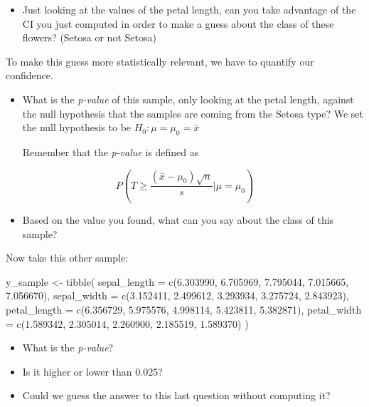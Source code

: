 \documentclass[
  oneside]{book}
\newenvironment{Shaded}{\begin{snugshade}}{\end{snugshade}}
\newcommand{\AttributeTok}[1]{\textcolor[rgb]{0.77,0.63,0.00}{#1}}
\newcommand{\FloatTok}[1]{\textcolor[rgb]{0.00,0.00,0.81}{#1}}
\newcommand{\FunctionTok}[1]{\textcolor[rgb]{0.00,0.00,0.00}{#1}}
\newcommand{\NormalTok}[1]{#1}
\newcommand{\OtherTok}[1]{\textcolor[rgb]{0.56,0.35,0.01}{#1}}
\providecommand{\tightlist}{%
  \setlength{\itemsep}{0pt}\setlength{\parskip}{0pt}}
\begin{document}
\begin{itemize}
\tightlist
\item
  Just looking at the values of the petal length,
  can you take advantage of the CI you just computed
  in order to make a guess about the class of these flowers?
  (Setosa or not Setosa)
\end{itemize}

To make this guess more statistically relevant, we have
to quantify our confidence.

\begin{itemize}
\item
  What is the \emph{p-value} of this sample, only looking at the
  petal length, against the null hypothesis that the
  samples are coming from the Setosa type? We set the null
  hypothesis to be \(H_0: \mu = \mu_0 = \bar{x}\)

  Remember that the \emph{p-value} is defined as
\end{itemize}

\[ P\left(T \geq \frac{(\bar{x} - \mu_0)\sqrt{n}}{s} | \mu = \mu_0\right)\]

\begin{itemize}
\tightlist
\item
  Based on the value you found, what can you say
  about the class of this sample?
\end{itemize}

Now take this other sample:

\begin{Shaded}
\begin{Highlighting}[]
\NormalTok{y\_sample }\OtherTok{\textless{}{-}} \FunctionTok{tibble}\NormalTok{(}
  \AttributeTok{sepal\_length =} \FunctionTok{c}\NormalTok{(}\FloatTok{6.303990}\NormalTok{, }\FloatTok{6.705969}\NormalTok{, }\FloatTok{7.795044}\NormalTok{, }\FloatTok{7.015665}\NormalTok{, }\FloatTok{7.056670}\NormalTok{),}
  \AttributeTok{sepal\_width =} \FunctionTok{c}\NormalTok{(}\FloatTok{3.152411}\NormalTok{, }\FloatTok{2.499612}\NormalTok{, }\FloatTok{3.293934}\NormalTok{, }\FloatTok{3.275724}\NormalTok{, }\FloatTok{2.843923}\NormalTok{),}
  \AttributeTok{petal\_length =} \FunctionTok{c}\NormalTok{(}\FloatTok{6.356729}\NormalTok{, }\FloatTok{5.975576}\NormalTok{, }\FloatTok{4.998114}\NormalTok{, }\FloatTok{5.423811}\NormalTok{, }\FloatTok{5.382871}\NormalTok{),}
  \AttributeTok{petal\_width =} \FunctionTok{c}\NormalTok{(}\FloatTok{1.589342}\NormalTok{, }\FloatTok{2.305014}\NormalTok{, }\FloatTok{2.260900}\NormalTok{, }\FloatTok{2.185519}\NormalTok{, }\FloatTok{1.589370}\NormalTok{)}
\NormalTok{)}
\end{Highlighting}
\end{Shaded}

\begin{itemize}
\tightlist
\item
  What is the \emph{p-value}?
\item
  Is it higher or lower than 0.025?
\item
  Could we guess the answer to this last question
  without computing it?
\end{itemize}

  
\end{document}
